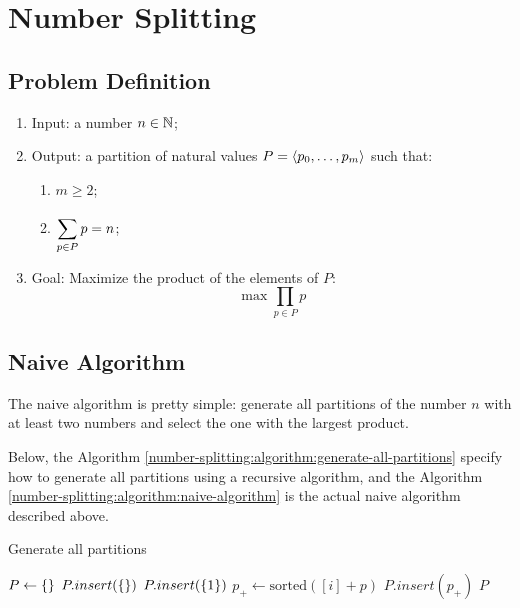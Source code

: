 \chapter{Number Splitting}

\newcommand{\Product}[2]{\prod\limits_{#1} #2}
\newcommand{\Floor}[1]{\left\lfloor #1 \right\rfloor}

\section{Problem Definition}

\begin{enumerate}
    \item Input: a number $n \in \mathbb{N}$;
    \item Output: a partition of natural values $P = \left\langle p_{0}, \dots, p_{m} \right\rangle$ such that:
    \begin{enumerate}
        \item $m \geqslant 2$;
        \item $\displaystyle\sum\limits_{p \in P}^{} p = n$;
    \end{enumerate}
    \item Goal: Maximize the product of the elements of $P$:
    \begin{equation}
        \max \Product{p \in P}{p}
    \end{equation}
\end{enumerate}

\section{Naive Algorithm}

The naive algorithm is pretty simple: generate all partitions of the number $n$ with at least two numbers and select the one with the largest product.

Below, the Algorithm \ref{number-splitting:algorithm:generate-all-partitions} specify how to generate all partitions using a recursive algorithm, and the Algorithm \ref{number-splitting:algorithm:naive-algorithm} is the actual naive algorithm described above.

\begin{algorithm}[H]
    \caption{Generate all partitions}
    \label{number-splitting:algorithm:generate-all-partitions}
    \begin{algorithmic}[1]
            \State $P \gets \left\{  \right\}$
                \State $P.insert(\left\{  \right\})$
                \State $P.insert(\left\{ 1 \right\})$
            \EndIf
                    \State $p_+ \gets \text{sorted}([i] + p)$
                    \State $P.insert(p_+)$
                \EndFor
            \EndFor
            \State \Return $P$
        \EndFunction
        \end{algorithmic}
\end{algorithm}

